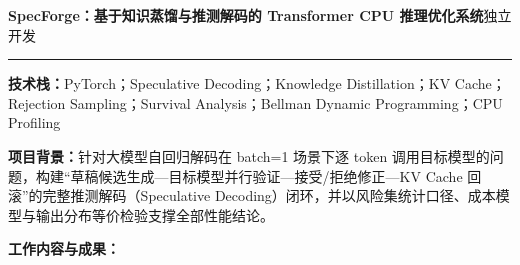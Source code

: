 \documentclass[10pt,a4paper]{ctexart}
\begin{document}
{\fontsize{14pt}{17pt}\selectfont\bfseries\color{heading} SpecForge：基于知识蒸馏与推测解码的 Transformer CPU 推理优化系统}\hfill{\small 独立开发}\par
\vspace{.3em}\hrule\vspace{.55em}
\textbf{技术栈：}PyTorch；Speculative Decoding；Knowledge Distillation；KV Cache；Rejection Sampling；Survival Analysis；Bellman Dynamic Programming；CPU Profiling

\vspace{.4em}
\textbf{项目背景：}针对大模型自回归解码在 batch=1 场景下逐 token 调用目标模型的问题，构建“草稿候选生成—目标模型并行验证—接受/拒绝修正—KV Cache 回滚”的完整推测解码（Speculative Decoding）闭环，并以风险集统计口径、成本模型与输出分布等价检验支撑全部性能结论。

\vspace{.35em}
\textbf{工作内容与成果：}
\end{document}
